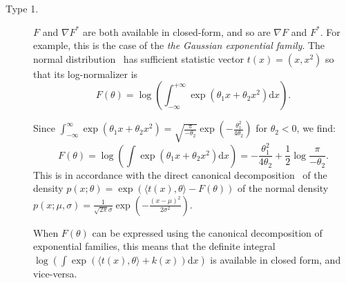 \documentclass[graybox]{svmult}
\def\inner#1#2{{\langle #1,#2\rangle}}
\def\dx{\mathrm{d}x}
\begin{document}
\begin{description}
\item[Type 1.]  $F$ and $\nabla F^*$ are both available in closed-form, and so are $\nabla F$ and $F^*$.
For example, this is the case of the  {\em the Gaussian exponential family}.
The normal distribution~\cite{flashcards-2009} has sufficient statistic vector $t(x)=(x,x^2)$ so that its log-normalizer is
\begin{equation}
F(\theta)=\log\left(\int_{-\infty}^{+\infty} \exp(\theta_1x+\theta_2 x^2) \dx\right).
\end{equation}

Since $\int_{-\infty}^{\infty} \exp(\theta_1x+\theta_2 x^2)=
\sqrt{\frac{\pi}{-\theta_2}}\exp(-\frac{\theta_1^2}{4\theta_2})$ for $\theta_2<0$, we find:
\begin{equation}
F(\theta)=\log\left(\int \exp(\theta_1x+\theta_2 x^2) \dx\right)
=-\frac{\theta_1^2}{4\theta_2}+\frac{1}{2}\log\frac{\pi}{-\theta_2}.
\end{equation}
This is in accordance with the direct canonical decomposition~\cite{flashcards-2009} of the density $p(x;\theta)=\exp(\inner{t(x)}{\theta}-F(\theta))$ of the normal density 
$p(x;\mu,\sigma)=\frac{1}{\sqrt{2\pi}\sigma}\exp(-\frac{(x-\mu)^2}{2\sigma^2})$.

\begin{remark}
When $F(\theta)$ can be expressed using the canonical decomposition of exponential families, this means that 
the definite integral $\log(\int \exp(\inner{t(x)}{\theta}+k(x))\dx)$ is available in closed form, and vice-versa.
\end{remark}


\end{description}
\end{document}
